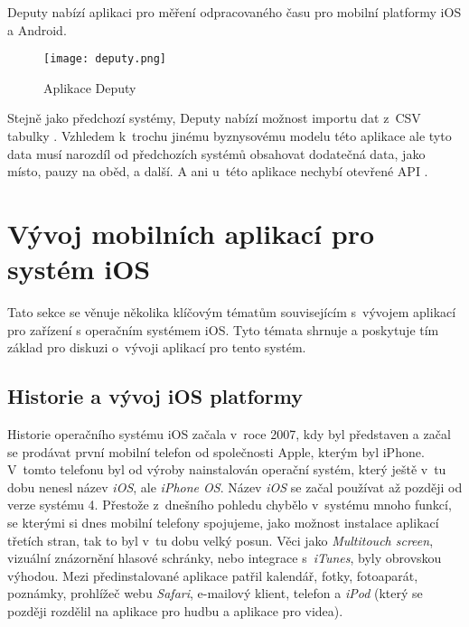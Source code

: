 Deputy nabízí aplikaci pro měření odpracovaného času pro mobilní platformy iOS a Android. 

\begin{figure}[h]
	\centering
	\texttt{[image: deputy.png]}
	\caption{Aplikace Deputy \cite{deputy-time-tracking-app}}
\end{figure}

Stejně jako předchozí systémy, Deputy nabízí možnost importu dat z~CSV tabulky \cite{deputy-import-csv}. Vzhledem k~trochu jinému byznysovému modelu této aplikace ale tyto data musí narozdíl od předchozích systémů obsahovat dodatečná data, jako místo, pauzy na oběd, a další. A ani u~této aplikace nechybí otevřené API \cite{deputy-api}.

\section{Vývoj mobilních aplikací pro systém iOS}

Tato sekce se věnuje několika klíčovým tématům souvisejícím s~vývojem aplikací pro zařízení s operačním systémem iOS. Tyto témata shrnuje a poskytuje tím základ pro diskuzi o~vývoji aplikací pro tento systém.

\subsection{Historie a vývoj iOS platformy}

Historie operačního systému iOS začala v~roce 2007, kdy byl představen a začal se prodávat první mobilní telefon od společnosti Apple, kterým byl iPhone. V~tomto telefonu byl od výroby nainstalován operační systém, který ještě v~tu dobu nenesl název \emph{iOS}, ale \emph{iPhone OS}. Název \emph{iOS} se začal používat až později od verze systému 4. Přestože z~dnešního pohledu chybělo v~systému mnoho funkcí, se kterými si dnes mobilní telefony spojujeme, jako možnost instalace aplikací třetích stran, tak to byl v~tu dobu velký posun. Věci jako \emph{Multitouch screen}, vizuální znázornění hlasové schránky, nebo integrace s~\emph{iTunes}, byly obrovskou výhodou. Mezi předinstalované aplikace patřil kalendář, fotky, fotoaparát, poznámky, prohlížeč webu \emph{Safari}, e-mailový klient, telefon a \emph{iPod} (který se později rozdělil na aplikace pro hudbu a aplikace pro videa).

